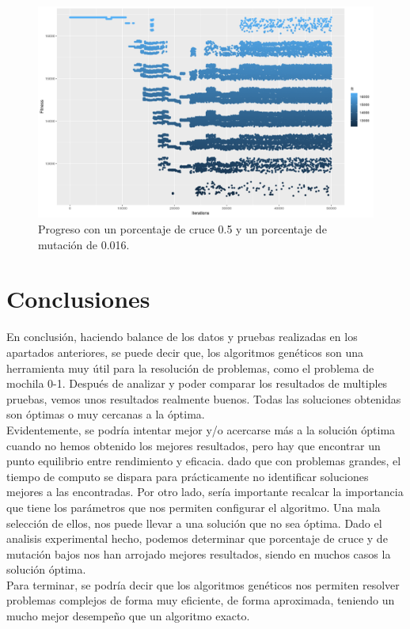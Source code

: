 \documentclass[runningheads]{llncs}
\begin{document}
\begin{figure}
	\centering
	\includegraphics[width=1.0\textwidth]{graphic_dispersion}
	\caption{Progreso con un porcentaje de cruce 0.5 y un porcentaje de mutación de 0.016.}
	\label{fig:results_crossover_0.5_mut_0.016}
\end{figure}


\section{Conclusiones}

En conclusión, haciendo balance de los datos y pruebas realizadas en los apartados anteriores, se puede decir que, los algoritmos genéticos son una herramienta muy útil para la resolución de problemas,
como el problema de mochila 0-1. Después de analizar y poder comparar los resultados de multiples pruebas, vemos unos resultados realmente buenos. Todas las soluciones obtenidas son óptimas o muy cercanas a la óptima.\\
Evidentemente, se podría intentar mejor y/o acercarse más a la solución óptima cuando no hemos obtenido los mejores resultados, pero hay que encontrar un punto equilibrio entre rendimiento y eficacia.
dado que con problemas grandes, el tiempo de computo se dispara para prácticamente no identificar soluciones mejores a las encontradas.
Por otro lado, sería importante recalcar la importancia que tiene los parámetros que nos permiten configurar el algoritmo. Una mala selección de ellos, nos puede llevar a una solución que no sea óptima.
Dado el analisis experimental hecho, podemos determinar que porcentaje de cruce y de mutación bajos nos han arrojado mejores resultados, siendo en muchos casos la solución óptima.\\
Para terminar, se podría decir que los algoritmos genéticos nos permiten resolver problemas complejos de forma muy eficiente, de forma aproximada, teniendo un mucho mejor desempeño que un algoritmo exacto.
\end{document}
